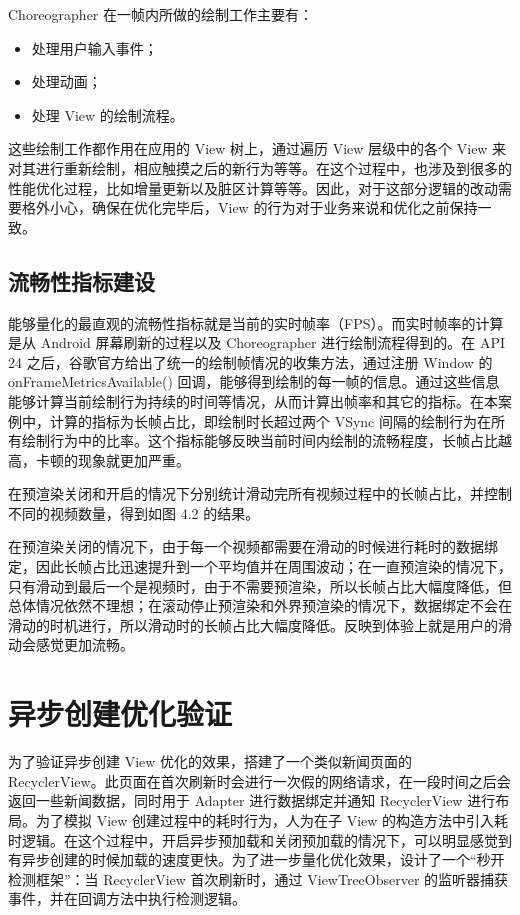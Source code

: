 Choreographer 在一帧内所做的绘制工作主要有：

\begin{itemize}
    \item 处理用户输入事件；
    \item 处理动画；
    \item 处理 View 的绘制流程。
\end{itemize}

这些绘制工作都作用在应用的 View 树上，通过遍历 View 层级中的各个 View 来对其进行重新绘制，相应触摸之后的新行为等等。在这个过程中，也涉及到很多的性能优化过程，比如增量更新以及脏区计算等等。因此，对于这部分逻辑的改动需要格外小心，确保在优化完毕后，View 的行为对于业务来说和优化之前保持一致。

\subsection{流畅性指标建设}

能够量化的最直观的流畅性指标就是当前的实时帧率（FPS）。而实时帧率的计算是从 Android 屏幕刷新的过程以及 Choreographer 进行绘制流程得到的。在 API 24 之后，谷歌官方给出了统一的绘制帧情况的收集方法，通过注册 Window 的 onFrameMetricsAvailable() 回调，能够得到绘制的每一帧的信息。通过这些信息能够计算当前绘制行为持续的时间等情况，从而计算出帧率和其它的指标。在本案例中，计算的指标为长帧占比，即绘制时长超过两个 VSync 间隔的绘制行为在所有绘制行为中的比率。这个指标能够反映当前时间内绘制的流畅程度，长帧占比越高，卡顿的现象就更加严重。

在预渲染关闭和开启的情况下分别统计滑动完所有视频过程中的长帧占比，并控制不同的视频数量，得到如图 4.2 的结果。
    


在预渲染关闭的情况下，由于每一个视频都需要在滑动的时候进行耗时的数据绑定，因此长帧占比迅速提升到一个平均值并在周围波动；在一直预渲染的情况下，只有滑动到最后一个是视频时，由于不需要预渲染，所以长帧占比大幅度降低，但总体情况依然不理想；在滚动停止预渲染和外界预渲染的情况下，数据绑定不会在滑动的时机进行，所以滑动时的长帧占比大幅度降低。反映到体验上就是用户的滑动会感觉更加流畅。

\section{异步创建优化验证}

为了验证异步创建 View 优化的效果，搭建了一个类似新闻页面的 RecyclerView。此页面在首次刷新时会进行一次假的网络请求，在一段时间之后会返回一些新闻数据，同时用于 Adapter 进行数据绑定并通知 RecyclerView 进行布局。为了模拟 View 创建过程中的耗时行为，人为在子 View 的构造方法中引入耗时逻辑。在这个过程中，开启异步预加载和关闭预加载的情况下，可以明显感觉到有异步创建的时候加载的速度更快。为了进一步量化优化效果，设计了一个“秒开检测框架”：当 RecyclerView 首次刷新时，通过 ViewTreeObserver 的监听器捕获事件，并在回调方法中执行检测逻辑。

